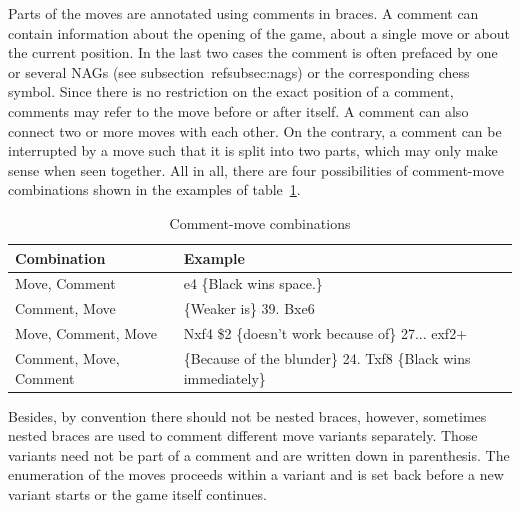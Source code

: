 \documentclass[article,type=msc,colorback,accentcolor=tud7b]{tudthesis}
\begin{document}
  	
	Parts of the moves are annotated using comments in braces. A comment can contain information about the opening of the game, about a single move or about the current position. In the last two cases the comment is often prefaced by one or several NAGs (see subsection~ref{subsec:nags}) or the corresponding chess symbol. Since there is no restriction on the exact position of a comment, comments may refer to the move before or after itself. A comment can also connect two or more moves with each other. On the contrary, a comment can be interrupted by a move such that it is split into two parts, which may only make sense when seen together. All in all, there are four possibilities of comment-move combinations shown in the examples of table~\ref{tab:comment_move_combinations}.
	
	\begin{table}[H]
      \centering
      \begin{tabular}{| l | l |}
    	\hline
    	Combination & Example \\ \hline
    	Move, Comment & e4 \{Black wins space.\} \\ \hline
    	Comment, Move & \{Weaker is\} 39. Bxe6 \\ \hline
    	Move, Comment, Move & Nxf4 \$2 \{doesn't work because of\} 27... exf2+ \\ \hline
    	Comment, Move, Comment & \{Because of the blunder\} 24. Txf8 \{Black wins immediately\} \\ \hline
      \end{tabular}      
      \caption{Comment-move combinations}
      \label{tab:comment_move_combinations}
    \end{table}
    
    Besides, by convention there should not be nested braces, however, sometimes nested braces are used to comment different move variants separately.	Those variants need not be part of a comment and are written down in parenthesis. The enumeration of the moves proceeds within a variant and is set back before a new variant starts or the game itself continues. 
   
\end{document}
